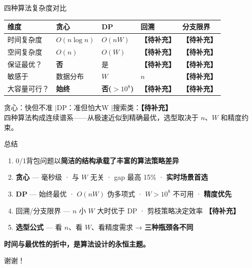 \documentclass[9pt]{ctexbeamer}
\newcommand{\tb}{\textcolor{ember}{\textbf{【待补充】}}}
\newcommand{\hi}[1]{\textcolor{ember}{\textbf{#1}}}
\newcommand{\blu}[1]{\textcolor{accent}{\textbf{#1}}}
\begin{document}
\begin{frame}{四种算法复杂度对比}

\vspace{-0.2cm}
\begin{table}
\renewcommand{\arraystretch}{1.3}
\small
\begin{tabular}{p{1.9cm}p{1.8cm}p{1.8cm}p{1.8cm}p{1.8cm}}
\toprule
\textbf{维度} & \textbf{贪心} & \textbf{DP} & \textbf{回溯} & \textbf{分支限界} \\
\midrule
时间复杂度 & $O(n\log n)$ & \hi{$O(nW)$} & \tb & \tb \\
空间复杂度 & $O(n)$ & \hi{$O(W)$} & \tb & \tb \\
保证最优？ & \hi{否} & 是 & \tb & \tb \\
敏感于 & 数据分布 & $W$ & $n$ & \tb \\
大容量可行？ & \blu{始终} & \hi{否($>10^8$)} & \tb & \tb \\
\bottomrule
\end{tabular}
\end{table}

\vspace{0.15cm}
\begin{center}
{\large\color{ink}贪心：快但不准 \quad$\mid$\quad DP：准但怕大W \quad$\mid$\quad 搜索类：\tb}\\[0.2cm]
{\footnotesize\color{slate}四种算法构成连续谱系——从极速近似到精确最优，选型取决于 $n$、$W$ 和精度约束。}
\end{center}

\end{frame}

\begin{frame}{总结}

\vspace{-0.1cm}
\begin{enumerate}
  \item 0/1背包问题以\hi{简洁的结构承载了丰富的算法策略差异}

  \item \hi{贪心} — 毫秒级 · 与 $W$ 无关 · gap 最高 15\% · \blu{实时场景首选}

  \item \blu{DP} — 始终最优 · $O(nW)$ 伪多项式 · $W>10^8$ 不可用 · \blu{精度优先}

  \item 回溯/分支限界 — $n$ 小 $W$ 大时优于 DP · 剪枝策略决定效率 \tb

  \item \textbf{选型公式} — 看 $n$、看 $W$、看精度需求 → \hi{三种瓶颈各不同}
\end{enumerate}

\vspace{0.3cm}
\begin{center}
{\large\color{ink}\textbf{时间与最优性的折中，是算法设计的永恒主题。}}
\end{center}

\vspace{0.15cm}
\begin{flushright}
{\footnotesize\color{rule}谢谢！}
\end{flushright}

\end{frame}
\end{document}
